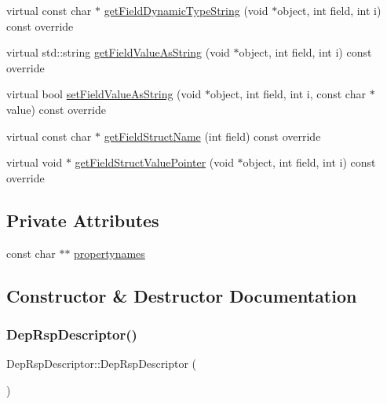 \begin{DoxyCompactItemize}
\item 
virtual const char $\ast$ \hyperlink{classDepRspDescriptor_ad838a8750347f561ed11e90b256aeb22}{get\+Field\+Dynamic\+Type\+String} (void $\ast$object, int field, int i) const override
\item 
virtual std\+::string \hyperlink{classDepRspDescriptor_a026817a85cc05c7437c2a268a1829904}{get\+Field\+Value\+As\+String} (void $\ast$object, int field, int i) const override
\item 
virtual bool \hyperlink{classDepRspDescriptor_a3414d7eb627262e4a5a99c30c1576f8f}{set\+Field\+Value\+As\+String} (void $\ast$object, int field, int i, const char $\ast$value) const override
\item 
virtual const char $\ast$ \hyperlink{classDepRspDescriptor_a0cd988268afab355cb362d4b00e85a33}{get\+Field\+Struct\+Name} (int field) const override
\item 
virtual void $\ast$ \hyperlink{classDepRspDescriptor_a08b3228538e6111c6f337ead9abbf557}{get\+Field\+Struct\+Value\+Pointer} (void $\ast$object, int field, int i) const override
\end{DoxyCompactItemize}
\subsection*{Private Attributes}
\begin{DoxyCompactItemize}
\item 
const char $\ast$$\ast$ \hyperlink{classDepRspDescriptor_a496616950826cf009074023668b335de}{propertynames}
\end{DoxyCompactItemize}


\subsection{Constructor \& Destructor Documentation}
\mbox{\label{classDepRspDescriptor_ad256a6a63460351ea6a372618915c2d8}} 
\subsubsection{\texorpdfstring{Dep\+Rsp\+Descriptor()}{DepRspDescriptor()}}
{\footnotesize\ttfamily Dep\+Rsp\+Descriptor\+::\+Dep\+Rsp\+Descriptor (\begin{DoxyParamCaption}{ }\end{DoxyParamCaption})}

